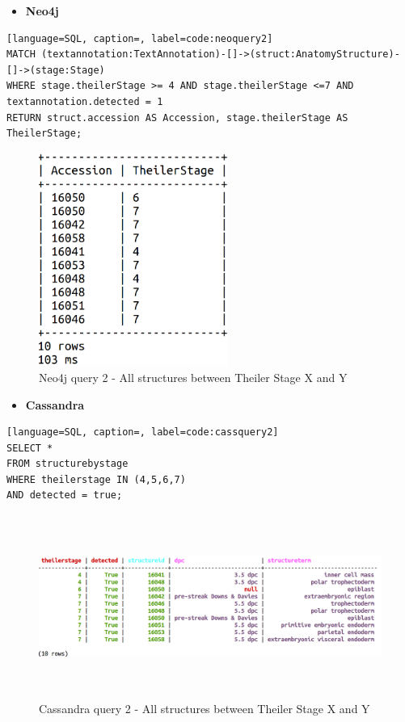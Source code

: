 \begin{itemize}[leftmargin=*]
\item \textbf{Neo4j}
\end{itemize}

\begin{lstlisting}[language=SQL, caption=, label=code:neoquery2]
MATCH (textannotation:TextAnnotation)-[]->(struct:AnatomyStructure)-[]->(stage:Stage)
WHERE stage.theilerStage >= 4 AND stage.theilerStage <=7 AND textannotation.detected = 1
RETURN struct.accession AS Accession, stage.theilerStage AS TheilerStage;
\end{lstlisting}

\begin{figure}[H]\begin{center}\includegraphics[height=7cm,width=0.4\linewidth]{images/neo4jquery2terminal}\caption{Neo4j query 2 - All structures between Theiler Stage X and Y}\label{fig:neo4jquery2terminal}\end{center}\end{figure}

\begin{itemize}[leftmargin=*]
\item \textbf{Cassandra}
\end{itemize}

\begin{lstlisting}[language=SQL, caption=, label=code:cassquery2]
SELECT *
FROM structurebystage
WHERE theilerstage IN (4,5,6,7)
AND detected = true;
\end{lstlisting}

\begin{figure}[H]\begin{center}\includegraphics[height=6cm,width=1\linewidth]{images/cassandraquery2}\caption{Cassandra query 2 - All structures between Theiler Stage X and Y}\label{fig:cassandraquery2}\end{center}\end{figure}

